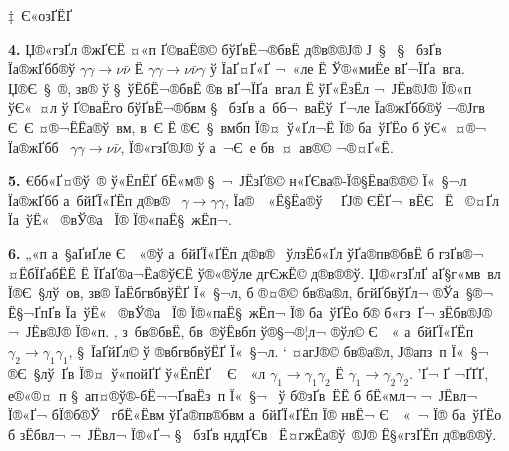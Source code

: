 \begin{Slide}{‡ Є«озҐ­ЁҐ} 


{\bf 4.} Џ®«гзҐ­л ®жҐ­ЄЁ ¤«п ­Ґ©ваЁ­­®© бўҐвЁ¬®бвЁ д®в®­­®Ј® Ј §  §  бзҐв Їа®жҐбб®ў 
$\gamma \gamma\to \nu \bar\nu $ Ё $\gamma \gamma \to \nu \bar\nu \gamma$ 
ў ЇаҐ¤Ґ«Ґ 
¬ «ле Ё Ў®«миЁе вҐ¬ЇҐа вга. Џ®Є § ­®, зв® 
 ў § ўЁбЁ¬®бвЁ 
®в вҐ¬ЇҐа вгал Ё ўҐ«ЁзЁ­л ¬ Ј­Ёв­®Ј® Ї®«п ўЄ« ¤л ў ­Ґ©ваЁ­­го бўҐвЁ¬®бвм 
§  бзҐв а бб¬ ваЁў Ґ¬ле Їа®жҐбб®ў 
¬®Јгв Є Є ¤®¬Ё­Ёа®ў вм, в Є Ё ®Є § вмбп Ї®¤ ў«Ґ­­л¬Ё Ї® 
ба ў­Ґ­Ёо б ўЄ« ¤®¬ Їа®жҐбб  
$\gamma \gamma\to \nu \bar\nu $, Ї®«гзҐ­­®Ј® ў а ¬Є е бв ­¤ ав­®© ¬®¤Ґ«Ё. 

{\bf 5.} €бб«Ґ¤®ў ­® ў«Ёп­ЁҐ бЁ«м­® § ¬ Ј­ЁзҐ­­®© н«ҐЄва®­-Ї®§Ёва®­­®© Ї« §¬л ­  
Їа®жҐбб а бйҐЇ«Ґ­Ёп 
д®в®­  $\gamma \to \gamma \gamma$, 
Їа® ­ «Ё§Ёа®ў ­  ҐЈ®  ЄЁ­Ґ¬ вЁЄ  Ё ­ ©¤Ґ­л Їа ўЁ«  ®вЎ®а  Ї® Ї®«паЁ§ жЁп¬. 

{\bf 6.} „«п а §аҐиҐ­­ле Є ­ «®ў а бйҐЇ«Ґ­Ёп д®в®­  ўлзЁб«Ґ­л  
ўҐа®пв­®бвЁ б гзҐв®¬ ¤ЁбЇҐабЁЁ Ё ЇҐаҐ­®а¬Ёа®ўЄЁ ў®«­®ўле 
дг­ЄжЁ© д®в®­®ў. 
Џ®«гзҐ­­лҐ аҐ§г«мв вл Ї®Є §лў ов, зв® ЇаЁбгвбвўЁҐ Ї« §¬л, б ®¤­®© 
бв®а®­л, бгйҐбвўҐ­­л¬ ®Ўа §®¬ Ё§¬Ґ­пҐв Їа ўЁ«  ®вЎ®а  Ї® Ї®«паЁ§ жЁп¬ 
Ї® ба ў­Ґ­Ёо б® б«гз Ґ¬ зЁбв®Ј® ¬ Ј­Ёв­®Ј® Ї®«п.
‚ з бв­®бвЁ, бв ­®ўЁвбп ў®§¬®¦­л¬ ­®ўл© Є ­ « а бйҐЇ«Ґ­Ёп 
$\gamma_2 \to \gamma_1 \gamma_1$, § ЇаҐйҐ­­л© ў ®вбгвбвўЁҐ Ї« §¬л.
‘ ¤агЈ®© бв®а®­л, Ј®апз п Ї« §¬  
®Є §лў Ґв Ї®¤ ў«пойҐҐ ў«Ёп­ЁҐ ­  Є ­ «л $\gamma_1 \to \gamma_1 \gamma_2$ 
Ё $\gamma_1 \to \gamma_2 \gamma_2$. ’Ґ¬ ­Ґ ¬Ґ­ҐҐ, 
е®«®¤­ п § ап¤®ў®-бЁ¬¬ҐваЁз­ п Ї« §¬  ў б®зҐв ­ЁЁ б бЁ«м­л¬ 
¬ Ј­Ёв­л¬ Ї®«Ґ¬ бЇ®б®Ў­  гбЁ«Ёвм ўҐа®пв­®бвм а бйҐЇ«Ґ­Ёп Ї® нвЁ¬ Є ­ « ¬ 
Ї® ба ў­Ґ­Ёо б зЁбвл¬ ¬ Ј­Ёв­л¬ Ї®«Ґ¬ §  бзҐв нддҐЄв  Ё­¤гжЁа®ў ­­®Ј® 
Ё§«гзҐ­Ёп д®в®­®ў. 


\end{Slide}



